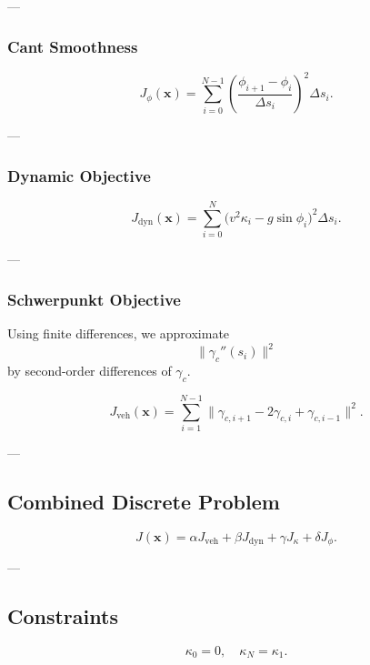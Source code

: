 ---

\subsubsection{Cant Smoothness}

\[
J_\phi(\mathbf{x})
=
\sum_{i=0}^{N-1}
\left(
\frac{\phi_{i+1}-\phi_i}{\Delta s_i}
\right)^2
\Delta s_i.
\]

---

\subsubsection{Dynamic Objective}

\[
J_{\mathrm{dyn}}(\mathbf{x})
=
\sum_{i=0}^{N}
\bigl(
v^2 \kappa_i - g \sin\phi_i
\bigr)^2
\Delta s_i.
\]

---

\subsubsection{Schwerpunkt Objective}

\begin{remark}
Using finite differences, we approximate
\[
\|\gamma_c''(s_i)\|^2
\]
by second-order differences of \(\gamma_c\).
\end{remark}

\[
J_{\mathrm{veh}}(\mathbf{x})
=
\sum_{i=1}^{N-1}
\|\gamma_{c,i+1} - 2\gamma_{c,i} + \gamma_{c,i-1}\|^2.
\]

---

\subsection{Combined Discrete Problem}

\begin{definition}
\[
J(\mathbf{x})
=
\alpha J_{\mathrm{veh}}
+
\beta J_{\mathrm{dyn}}
+
\gamma J_\kappa
+
\delta J_\phi.
\]
\end{definition}

---

\subsection{Constraints}

\begin{definition}
\[
\kappa_0 = 0,
\quad
\kappa_N = \kappa_1.
\]
\end{definition}


